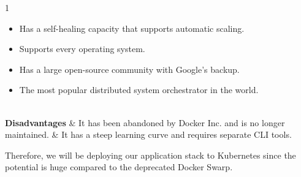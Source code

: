 \begin{table}[H]
\begin{tabularx}{1\textwidth}
\begin{itemize}[leftmargin=*, topsep=0pt, itemsep=1pt, parsep=2pt]
                                                                                                                                                                                                                                                                                   \item Has a self-healing capacity that supports automatic scaling.
                                                                                                                                                                                                                                                                                   \item Supports every operating system.
                                                                                                                                                                                                                                                                                   \item Has a large open-source community with Google's backup.
                                                                                                                                                                                                                                                                                   \item The most popular distributed system orchestrator in the world.
                                                                                                                                                                                                                                                                               \end{itemize}                                                         \\
        \hline
        \textbf {Disadvantages}             & \noindent It has been abandoned by Docker Inc. and is no longer maintained.                                                                                                                                                                                                         & \noindent It has a steep learning curve and requires separate CLI tools. \\
        \hline
    \end{tabularx}
\end{table}
Therefore, we will be deploying our application stack to Kubernetes since the potential is huge compared to the deprecated Docker Swarp.

